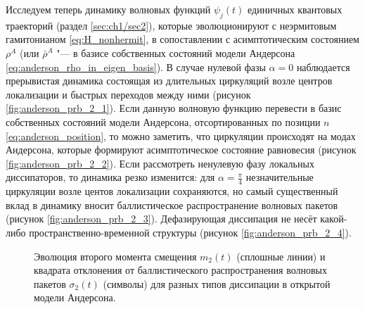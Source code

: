 Исследуем теперь динамику волновых функций \(\psi_j(t)\) единичных квантовых траекторий (раздел \cref{sec:ch1/sec2}), которые эволюционируют с неэрмитовым гамитонианом \cref{eq:H_nonhermit}, в сопоставлении с асимптотическим состоянием \(\rho^A\) (или \(\bar{\rho}^A\) "--- в базисе собственных состояний модели Андерсона \cref{eq:anderson_rho_in_eigen_basis}). 
В случае нулевой фазы \(\alpha=0\) наблюдается прерывистая динамика состоящая из длительных циркуляций возле центров локализации и быстрых переходов между ними (рисунок \cref{fig:anderson_prb_2_1}). 
Если данную волновую функцию перевести в базис собственных состояний модели Андерсона,  отсортированных по позиции \(n\) \cref{eq:anderson_position}, то можно заметить, что циркуляции происходят на модах Андерсона, которые формируют асимптотическое состояние равновесия \cite{Yusipov2017} (рисунок \cref{fig:anderson_prb_2_2}). 
Если рассмотреть ненулевую фазу локальных диссипаторов, то динамика резко изменится: для \(\alpha=\frac{\pi}{4}\) незначительные циркуляции возле центов локализации сохраняются, но самый существенный вклад в динамику вносит баллистическое распространение волновых пакетов (рисунок \cref{fig:anderson_prb_2_3}). 
Дефазирующая диссипация не несёт какой-либо пространственно-временной структуры (рисунок \cref{fig:anderson_prb_2_4}).

\begin{figure}[h]
	\caption{
		Эволюция второго момента смещения \(m_2(t)\) (сплошные линии) и квадрата отклонения от баллистического распространения волновых пакетов \(\sigma_2(t)\) (символы) для разных типов диссипации в открытой модели Андерсона.
	}
	\label{fig:anderson_prb_3}
\end{figure}

